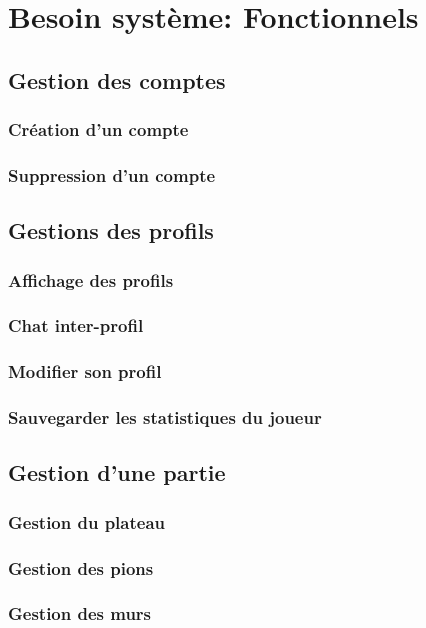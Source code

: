 \documentclass[utf8]{article}
\begin{document}
\section{Besoin système: Fonctionnels}

  \subsection{Gestion des comptes}
    \subsubsection{Création d'un compte}
    \subsubsection{Suppression d'un compte}
  \subsection{Gestions des profils}
    \subsubsection{Affichage des profils}
    \subsubsection{Chat inter-profil}
    \subsubsection{Modifier son profil}
    \subsubsection{Sauvegarder les statistiques du joueur}
  \subsection{Gestion d'une partie}
    \subsubsection{Gestion du plateau}
    \subsubsection{Gestion des pions}
    \subsubsection{Gestion des murs}
\end{document}
